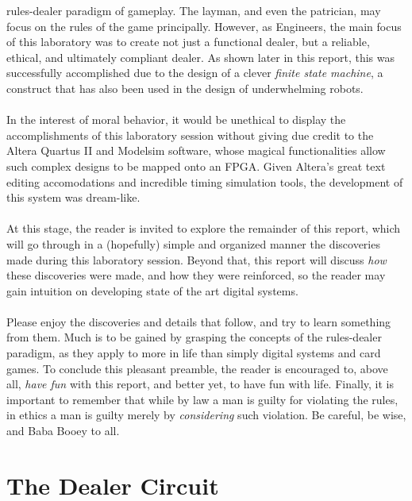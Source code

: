 \documentclass[12pt]{report}
\begin{document}
rules-dealer paradigm of gameplay. The layman, and even the patrician, may focus on the rules of the
game principally. However, as Engineers, the main focus of this laboratory was to create not just a
functional dealer, but a reliable, ethical, and ultimately compliant dealer. As shown later in this
report, this was successfully accomplished due to the design of a clever \textit{finite state
machine}, a construct that has also been used in the design of underwhelming robots.\\\\
In the interest of moral behavior, it would be unethical to display the accomplishments of this
laboratory session without giving due credit to the Altera Quartus II and Modelsim software, whose
magical functionalities allow such complex designs to be mapped onto an FPGA. Given Altera's great
text editing accomodations and incredible timing simulation tools, the development of this system
was dream-like.\\\\
At this stage, the reader is invited to explore the remainder of this report, which will go through
in a (hopefully) simple and organized manner the discoveries made during this laboratory session.
Beyond that, this report will discuss \textit{how} these discoveries were made, and how they were
reinforced, so the reader may gain intuition on developing state of the art digital systems.\\\\
Please enjoy the discoveries and details that follow, and try to learn something from them. Much is
to be gained
by grasping the concepts of the rules-dealer paradigm, as they apply to more in life than simply
digital systems and card games. To conclude this pleasant preamble, the reader is encouraged to,
above all, \textit{have fun} with this report, and better yet, to have fun with life. Finally, it is
important to remember that while by law a man is guilty for violating the rules, in ethics a man is
guilty merely by \textit{considering} such violation. Be careful, be wise, and Baba Booey to all.

\part{The Dealer Circuit}
\end{document}
